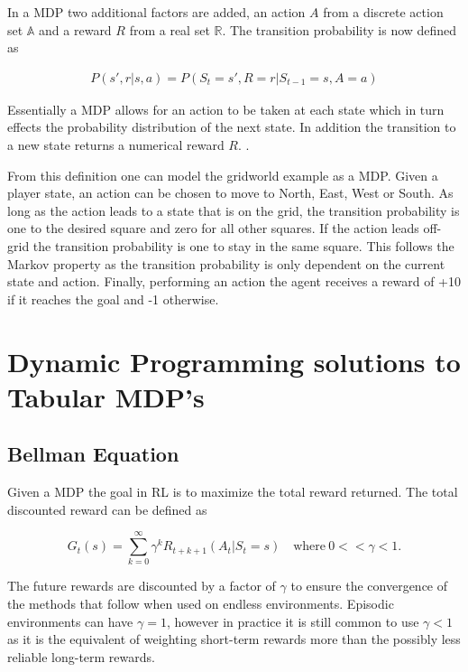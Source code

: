 In a MDP two additional factors are added, an action $A$ from a discrete action set $\mathbb{A}$ and a reward $R$ from a real set $\mathbb{R}$. The transition probability is now defined as

\begin{align}
    P(s',r|s,a) = P(S_{t}=s', R=r|S_{t-1}=s, A=a)
\end{align}

Essentially a MDP allows for an action to be taken at each state which in turn effects the probability distribution of the next state. In addition the transition to a new state returns a numerical reward $R$. \citep[p.~38]{sutton_barto_2018}. 

From this definition one can model the gridworld example as a MDP. Given a player state, an action can be chosen to move to North, East, West or South. As long as the action leads to a state that is on the grid, the transition probability is one to the desired square and zero for all other squares. If the action leads off-grid the transition probability is one to stay in the same square. This follows the Markov property as the transition probability is only dependent on the current state and action. Finally, performing an action the agent receives a reward of +10 if it reaches the goal and -1 otherwise.  

\section{Dynamic Programming solutions to Tabular MDP's}

\subsection{Bellman Equation}

Given a MDP the goal in RL is to maximize the total reward returned. The total discounted reward can be defined as

\begin{equation}
    \label{eq:return}
    G_t(s) = \sum_{k=0}^\infty \gamma^kR_{t+k+1}(A_t| S_t=s)\quad \text{where} ~ 0 << \gamma < 1.
\end{equation}

The future rewards are discounted by a factor of $\gamma$ to ensure the convergence of the methods that follow when used on endless environments. Episodic environments can have $\gamma=1$, however in practice it is still common to use $\gamma < 1$ as it is the equivalent of weighting short-term rewards more than the possibly less reliable long-term rewards.

